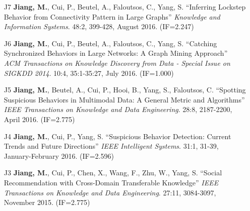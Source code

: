 \documentclass[10pt]{article}
\newenvironment{myindentpar}[1]%
{\begin{list}{}%
         {\setlength{\leftmargin}{#1}}%
         \item[]%
}
{\end{list}}
\newcounter{list}
\begin{document}
\begin{myindentpar}{0.00cm}
\begin{enumerate}[leftmargin=.5cm]
\item[J7] \textbf{Jiang, M.}, Cui, P., Beutel, A., Faloutsos, C., Yang, S. ``Inferring Lockstep Behavior from Connectivity Pattern in Large Graphs'' \textit{Knowledge and Information Systems}. 48:2, 399-428, August 2016. (IF=2.247)

\vspace{-0.1cm}

\item[J6] \textbf{Jiang, M.}, Cui, P., Beutel, A., Faloutsos, C., Yang, S. ``Catching Synchronized Behaviors in Large Networks: A Graph Mining Approach'' \textit{ACM Transactions on Knowledge Discovery from Data - Special Issue on SIGKDD 2014}. 10:4, 35:1-35:27, July 2016. (IF=1.000)

\vspace{-0.1cm}

\item[J5] \textbf{Jiang, M.}, Beutel, A., Cui, P., Hooi, B., Yang, S., Faloutsos, C. ``Spotting Suspicious Behaviors in Multimodal Data: A General Metric and Algorithms'' \textit{IEEE Transactions on Knowledge and Data Engineering}. 28:8, 2187-2200, April 2016. (IF=2.775)

\vspace{-0.1cm}

\item[J4] \textbf{Jiang, M.}, Cui, P., Yang, S. ``Suspicious Behavior Detection: Current Trends and Future Directions'' \textit{IEEE Intelligent Systems}. 31:1, 31-39, January-February 2016. (IF=2.596)

\vspace{-0.1cm}

\item[J3] \textbf{Jiang, M.}, Cui, P., Chen, X., Wang, F., Zhu, W., Yang, S. ``Social Recommendation with Cross-Domain Transferable Knowledge'' \textit{IEEE Transactions on Knowledge and Data Engineering}. 27:11, 3084-3097, November 2015. (IF=2.775)


\end{enumerate}
\end{myindentpar}
\end{document}
